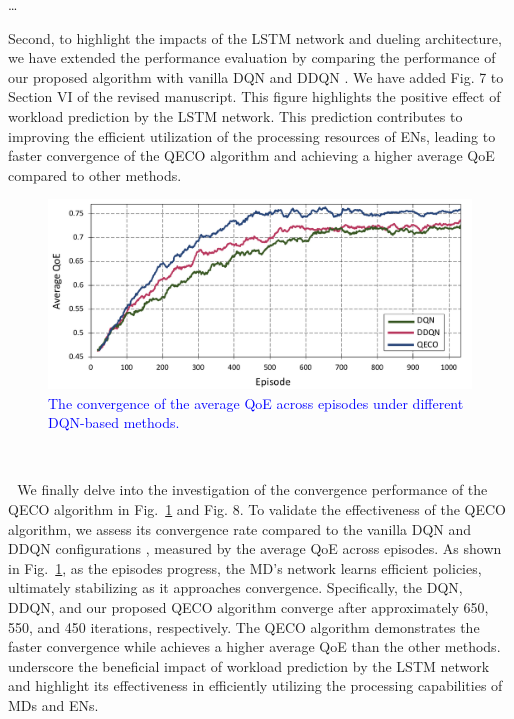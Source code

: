 \documentclass[12pt,draftclsnofoot,onecolumn]{IEEEtran}
\newcommand{\rev}[1]{{\color{blue}#1}} %
\newcommand{\rev}[1]{#1}
\newenvironment{my}[2]%
{\begin{list}{}%
{\setlength{\rightmargin}{#1}\setlength{\leftmargin}{#2}}%


 \item[]{}

} {\end{list}}
\begin{document}
\begin{enumerate}
\begin{my}{1cm}{1cm}
{{\begin{itemize}
	
\end{itemize}
\dots
}}
\end{my}
\vspace{5mm}

Second, to highlight the impacts of the LSTM network and dueling architecture, we have extended the performance evaluation by comparing the performance of our proposed algorithm with vanilla DQN and DDQN \cite{van2016deep}. We have added Fig. 7 to Section VI of the revised manuscript.
This figure highlights the positive effect of workload prediction by the LSTM network. This prediction contributes to improving the efficient utilization of the processing resources of ENs, leading to faster convergence of the QECO algorithm and achieving a higher average QoE compared to other methods. 

 



\setcounter{figure}{6}

\begin{figure}[H]
	\captionsetup{name=Fig.}
	\centering
	\includegraphics[width=.6\linewidth]{m1}
	\vspace*{-3mm}
	\caption{\textcolor{blue}{The convergence of the average QoE across episodes under different DQN-based methods.}}
	\vspace*{-3mm}
	\label{chart000}
\end{figure}

		\begin{my}{1cm}{1cm}
	\rev{
		{\

	\,\,\,\,We finally delve into the investigation of the convergence performance of the QECO algorithm in Fig.~\ref{chart000} and Fig. 8. To validate the effectiveness of the QECO algorithm, we assess its convergence rate compared to the vanilla DQN and DDQN configurations \cite{van2016deep}, measured by the average QoE across episodes. As shown in Fig.~\ref{chart000}, as the episodes progress, the MD's network learns efficient policies, ultimately stabilizing as it approaches convergence. Specifically, the DQN, DDQN, and our proposed QECO algorithm converge after approximately 650, 550, and 450 iterations, respectively. The QECO algorithm demonstrates the faster convergence while achieves a higher average QoE than the other methods. underscore the beneficial impact of workload prediction by the LSTM network and highlight its effectiveness in efficiently utilizing the processing capabilities of  MDs and ENs.
}}
\end{my}



\end{enumerate}
\end{document}
